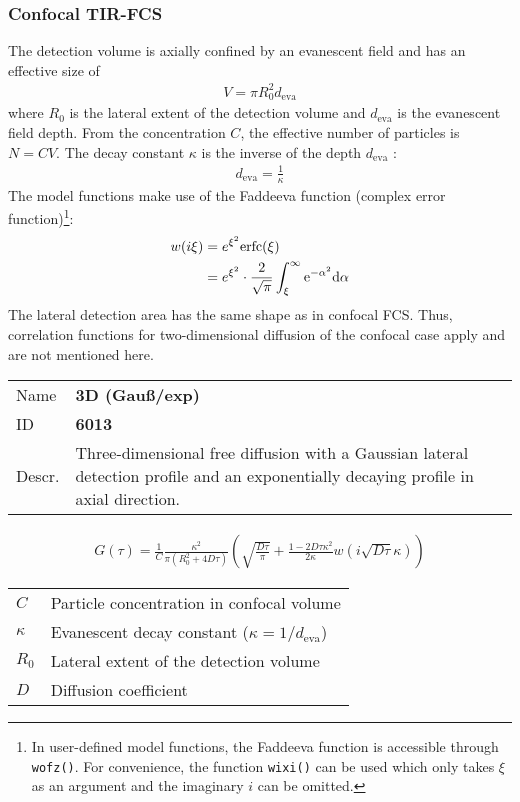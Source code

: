 \subsubsection{Confocal TIR-FCS}
The detection volume is axially confined by an evanescent field and has an effective size of
\begin{align}
V = \pi R_0^2 d_\mathrm{eva}
\end{align} 
where $R_0$ is the lateral extent of the detection volume and $d_\mathrm{eva}$ is the evanescent field depth. From the concentration $C$, the effective number of particles is $N=CV$.
The decay constant $\kappa$ is the inverse of the depth $d_\mathrm{eva}$ :
\begin{align}
d_\mathrm{eva} = \frac{1}{\kappa}
\end{align} 
The model functions make use of the Faddeeva function (complex error function)\footnote{In user-defined model functions, the Faddeeva function is accessible through \texttt{wofz()}. For convenience, the function \texttt{wixi()} can be used which only takes $\xi$ as an argument and the imaginary $i$ can be omitted.}:
\begin{align}
w(i\xi) &= e^{\xi^2} \mathrm{erfc}(\xi) \\
\notag &= e^{\xi^2} \cdot  \frac{2}{\sqrt{\pi}} \int_\xi^\infty \mathrm{e}^{-\alpha^2} \mathrm{d\alpha} \label{eq:faddeeva}
\end{align} 
The lateral detection area has the same shape as in confocal FCS. Thus, correlation functions for two-dimensional diffusion of the confocal case apply and are not mentioned here. \\
\vspace{2em}


\noindent \begin{tabular}{lp{}}
Name & \textbf{3D (Gauß/exp)} \\ 
ID & \textbf{6013} \\ 
Descr. &  Three-dimensional free diffusion with a Gaussian lateral detection profile and an exponentially decaying profile in axial direction. \\ 
\end{tabular}
\begin{align}
G(\tau) = \frac{1}{C}  \frac{ \kappa^2}{ \pi (R_0^2 +4D\tau)}
 \left( \sqrt{\frac{D \tau}{\pi}} + \frac{1 - 2 D \tau \kappa^2}{2 \kappa}  w\left(i \sqrt{D \tau} \kappa\right) \right)
\end{align} 
\begin{center}
\begin{tabular}{ll}
$C$ & Particle concentration in confocal volume \\ 
$\kappa$ &  Evanescent decay constant ($\kappa = 1/d_\mathrm{eva}$)\\ 
$R_0$ & Lateral extent of the detection volume \\
$D$ & Diffusion coefficient  \\
\end{tabular}
\end{center}
\vspace{2em}


